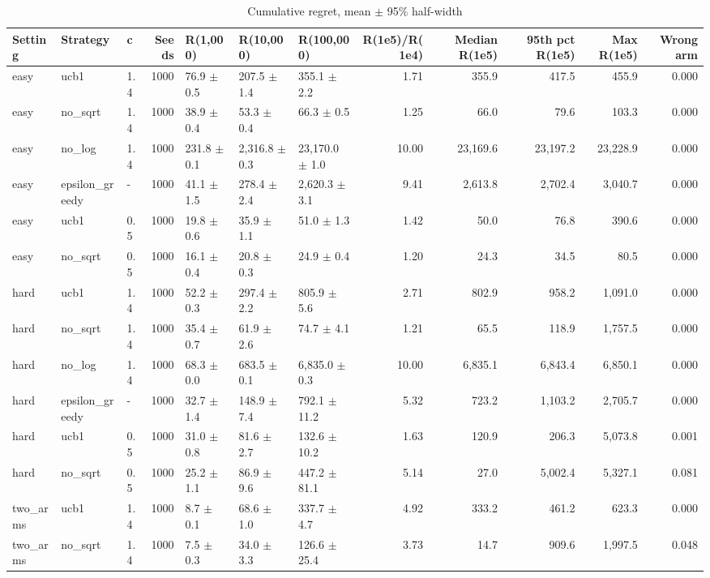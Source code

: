 \begin{table}[!t]
\centering
\caption{Cumulative regret, mean $\pm$ 95\% half-width}
\label{tab:bandit_regret}
\small
\begin{tabular}{lllrlllrrrrr}
\toprule
Setting & Strategy & c & Seeds & R(1,000) & R(10,000) & R(100,000) & R(1e5)/R(1e4) & Median R(1e5) & 95th pct R(1e5) & Max R(1e5) & Wrong arm \\
\midrule
easy & ucb1 & 1.4 & 1000 & 76.9 $\pm$ 0.5 & 207.5 $\pm$ 1.4 & 355.1 $\pm$ 2.2 & 1.71 & 355.9 & 417.5 & 455.9 & 0.000 \\
easy & no\_sqrt & 1.4 & 1000 & 38.9 $\pm$ 0.4 & 53.3 $\pm$ 0.4 & 66.3 $\pm$ 0.5 & 1.25 & 66.0 & 79.6 & 103.3 & 0.000 \\
easy & no\_log & 1.4 & 1000 & 231.8 $\pm$ 0.1 & 2,316.8 $\pm$ 0.3 & 23,170.0 $\pm$ 1.0 & 10.00 & 23,169.6 & 23,197.2 & 23,228.9 & 0.000 \\
easy & epsilon\_greedy & - & 1000 & 41.1 $\pm$ 1.5 & 278.4 $\pm$ 2.4 & 2,620.3 $\pm$ 3.1 & 9.41 & 2,613.8 & 2,702.4 & 3,040.7 & 0.000 \\
easy & ucb1 & 0.5 & 1000 & 19.8 $\pm$ 0.6 & 35.9 $\pm$ 1.1 & 51.0 $\pm$ 1.3 & 1.42 & 50.0 & 76.8 & 390.6 & 0.000 \\
easy & no\_sqrt & 0.5 & 1000 & 16.1 $\pm$ 0.4 & 20.8 $\pm$ 0.3 & 24.9 $\pm$ 0.4 & 1.20 & 24.3 & 34.5 & 80.5 & 0.000 \\
hard & ucb1 & 1.4 & 1000 & 52.2 $\pm$ 0.3 & 297.4 $\pm$ 2.2 & 805.9 $\pm$ 5.6 & 2.71 & 802.9 & 958.2 & 1,091.0 & 0.000 \\
hard & no\_sqrt & 1.4 & 1000 & 35.4 $\pm$ 0.7 & 61.9 $\pm$ 2.6 & 74.7 $\pm$ 4.1 & 1.21 & 65.5 & 118.9 & 1,757.5 & 0.000 \\
hard & no\_log & 1.4 & 1000 & 68.3 $\pm$ 0.0 & 683.5 $\pm$ 0.1 & 6,835.0 $\pm$ 0.3 & 10.00 & 6,835.1 & 6,843.4 & 6,850.1 & 0.000 \\
hard & epsilon\_greedy & - & 1000 & 32.7 $\pm$ 1.4 & 148.9 $\pm$ 7.4 & 792.1 $\pm$ 11.2 & 5.32 & 723.2 & 1,103.2 & 2,705.7 & 0.000 \\
hard & ucb1 & 0.5 & 1000 & 31.0 $\pm$ 0.8 & 81.6 $\pm$ 2.7 & 132.6 $\pm$ 10.2 & 1.63 & 120.9 & 206.3 & 5,073.8 & 0.001 \\
hard & no\_sqrt & 0.5 & 1000 & 25.2 $\pm$ 1.1 & 86.9 $\pm$ 9.6 & 447.2 $\pm$ 81.1 & 5.14 & 27.0 & 5,002.4 & 5,327.1 & 0.081 \\
two\_arms & ucb1 & 1.4 & 1000 & 8.7 $\pm$ 0.1 & 68.6 $\pm$ 1.0 & 337.7 $\pm$ 4.7 & 4.92 & 333.2 & 461.2 & 623.3 & 0.000 \\
two\_arms & no\_sqrt & 1.4 & 1000 & 7.5 $\pm$ 0.3 & 34.0 $\pm$ 3.3 & 126.6 $\pm$ 25.4 & 3.73 & 14.7 & 909.6 & 1,997.5 & 0.048 \\

\end{tabular}
\end{table}
